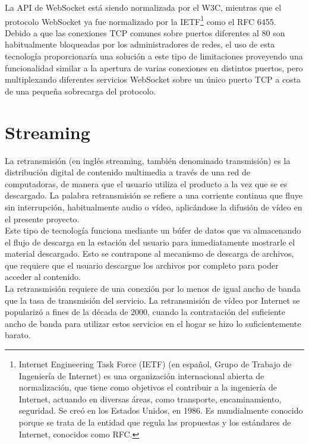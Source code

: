La API de WebSocket está siendo normalizada por el W3C, mientras que el protocolo WebSocket ya fue normalizado por la IETF\footnote{Internet Engineering Task Force (IETF) (en español, Grupo de Trabajo de Ingeniería de Internet)
es una organización internacional abierta de normalización, que tiene como objetivos el contribuir a la ingeniería de Internet, actuando en diversas áreas, como transporte, encaminamiento, seguridad.
Se creó en los Estados Unidos, en 1986. Es mundialmente conocido porque se trata de la entidad que regula las propuestas y los estándares de Internet, conocidos como RFC.} como el RFC 6455.\\

Debido a que las conexiones TCP comunes sobre puertos diferentes al 80 son habitualmente bloqueadas por los administradores de redes, el uso de esta tecnología proporcionaría una solución
a este tipo de limitaciones proveyendo una funcionalidad similar a la apertura de varias conexiones en distintos puertos, pero multiplexando diferentes servicios WebSocket sobre un único
puerto TCP a costa de una pequeña sobrecarga del protocolo.


\section{Streaming}
\label{sec:def-streaming}


La retransmisión (en inglés streaming, también denominado transmisión) es la distribución digital de contenido multimedia a través de una red de computadoras, 
de manera que el usuario utiliza el producto a la vez que se es descargado. La palabra retransmisión se refiere a una corriente continua que fluye sin interrupción, habitualmente audio o vídeo, aplicándose la difusión 
de vídeo en el presente proyecto. \\

Este tipo de tecnología funciona mediante un búfer de datos que va almacenando el flujo de descarga en la estación del usuario para inmediatamente mostrarle el material descargado. Esto se contrapone al mecanismo de
descarga de archivos, que requiere que el usuario descargue los archivos por completo para poder acceder al contenido.\\

La retransmisión requiere de una conexión por lo menos de igual ancho de banda que la tasa de transmisión del servicio. La retransmisión de vídeo por Internet se popularizó a fines de la década de 2000, 
cuando la contratación del suficiente ancho de banda para utilizar estos servicios en el hogar se hizo lo suficientemente barato.



